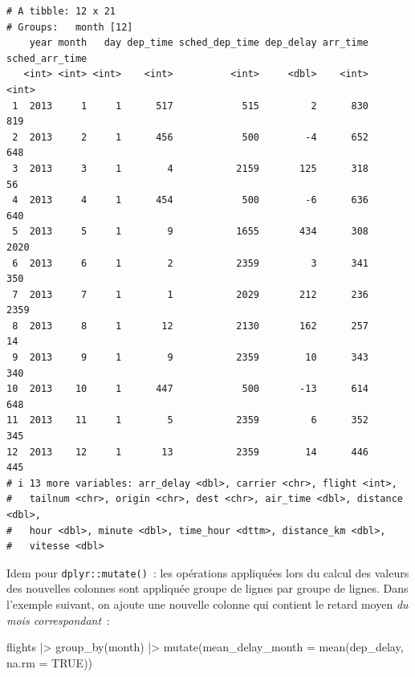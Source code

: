 \documentclass[
  letterpaper,
  DIV=11,
  numbers=noendperiod,
  oneside]{scrreprt}
\newenvironment{Shaded}{\begin{snugshade}}{\end{snugshade}}
\newcommand{\AttributeTok}[1]{\textcolor[rgb]{0.40,0.45,0.13}{#1}}
\newcommand{\ConstantTok}[1]{\textcolor[rgb]{0.56,0.35,0.01}{#1}}
\newcommand{\FunctionTok}[1]{\textcolor[rgb]{0.28,0.35,0.67}{#1}}
\newcommand{\NormalTok}[1]{\textcolor[rgb]{0.00,0.23,0.31}{#1}}
\newcommand{\SpecialCharTok}[1]{\textcolor[rgb]{0.37,0.37,0.37}{#1}}
\begin{document}
\begin{verbatim}
# A tibble: 12 x 21
# Groups:   month [12]
    year month   day dep_time sched_dep_time dep_delay arr_time sched_arr_time
   <int> <int> <int>    <int>          <int>     <dbl>    <int>          <int>
 1  2013     1     1      517            515         2      830            819
 2  2013     2     1      456            500        -4      652            648
 3  2013     3     1        4           2159       125      318             56
 4  2013     4     1      454            500        -6      636            640
 5  2013     5     1        9           1655       434      308           2020
 6  2013     6     1        2           2359         3      341            350
 7  2013     7     1        1           2029       212      236           2359
 8  2013     8     1       12           2130       162      257             14
 9  2013     9     1        9           2359        10      343            340
10  2013    10     1      447            500       -13      614            648
11  2013    11     1        5           2359         6      352            345
12  2013    12     1       13           2359        14      446            445
# i 13 more variables: arr_delay <dbl>, carrier <chr>, flight <int>,
#   tailnum <chr>, origin <chr>, dest <chr>, air_time <dbl>, distance <dbl>,
#   hour <dbl>, minute <dbl>, time_hour <dttm>, distance_km <dbl>,
#   vitesse <dbl>
\end{verbatim}

Idem pour \texttt{dplyr::mutate()}~: les opérations appliquées lors du
calcul des valeurs des nouvelles colonnes sont appliquée groupe de
lignes par groupe de lignes. Dans l'exemple suivant, on ajoute une
nouvelle colonne qui contient le retard moyen \emph{du mois
correspondant}~:

\begin{Shaded}
\begin{Highlighting}[]
\NormalTok{flights }\SpecialCharTok{|\textgreater{}} 
  \FunctionTok{group\_by}\NormalTok{(month) }\SpecialCharTok{|\textgreater{}} 
  \FunctionTok{mutate}\NormalTok{(}\AttributeTok{mean\_delay\_month =} \FunctionTok{mean}\NormalTok{(dep\_delay, }\AttributeTok{na.rm =} \ConstantTok{TRUE}\NormalTok{))}
\end{Highlighting}
\end{Shaded}
\end{document}
